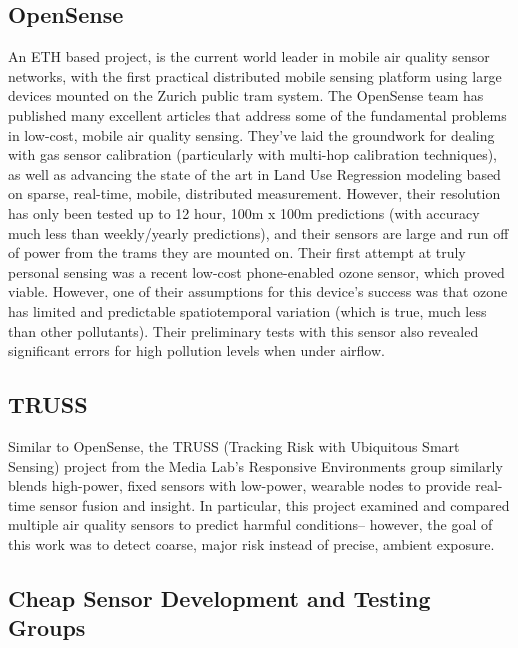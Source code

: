 \subsection{OpenSense} 

An ETH based project, is the current world leader in mobile air quality sensor networks, with the first practical distributed mobile sensing platform using large devices mounted on the Zurich public tram system. \cite{hasen2011}  The OpenSense team has published many excellent articles that address some of the fundamental problems in low-cost, mobile air quality sensing.  They've laid the groundwork for dealing with gas sensor calibration (particularly with multi-hop calibration techniques), as well as advancing the state of the art in Land Use Regression modeling based on sparse, real-time, mobile, distributed measurement.  However, their resolution has only been tested up to 12 hour, 100m x 100m predictions (with accuracy much less than weekly/yearly predictions), and their sensors are large and run off of power from the trams they are mounted on. Their first attempt at truly personal sensing was a recent low-cost phone-enabled ozone sensor, which proved viable. \cite{hasen2012_2}  However, one of their assumptions for this device's success was that ozone has limited and predictable spatiotemporal variation (which is true, much less than other pollutants). Their preliminary tests with this sensor also revealed significant errors for high pollution levels when under airflow. \cite{hasen2014, hasen2012, saukh2015}
	
\subsection{TRUSS}

Similar to OpenSense, the TRUSS (Tracking Risk with Ubiquitous Smart Sensing) project from the Media Lab's Responsive Environments group similarly blends high-power, fixed sensors with low-power, wearable nodes to provide real-time sensor fusion and insight. \cite{truss}  In particular, this project examined and compared multiple air quality sensors to predict harmful conditions-- however, the goal of this work was to detect coarse, major risk instead of precise, ambient exposure.

\subsection{Cheap Sensor Development and Testing Groups}


